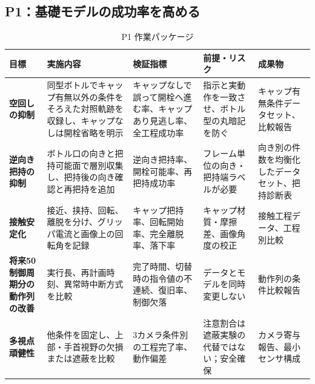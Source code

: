 \begin{landscape}
\section{P1：基礎モデルの成功率を高める}
\begin{table}[H]
\centering\footnotesize
\renewcommand{\arraystretch}{1.35}
\caption{P1 作業パッケージ}
\begin{tabularx}{\linewidth}{>{\bfseries}p{24mm}p{48mm}p{65mm}p{55mm}X}
\toprule
目標 & 実施内容 & 検証指標 & 前提・リスク & 成果物\\
\midrule
空回しの抑制 & 同型ボトルでキャップ有無以外の条件をそろえた対照軌跡を収録し、キャップなしは開栓省略を明示 & キャップなしで誤って開栓へ進む率、キャップあり見逃し率、全工程成功率 & 指示と実動作を一致させ、ボトル型の丸暗記を防ぐ & キャップ有無条件データセット、比較報告\\
逆向き把持の抑制 & ボトル口の向きと把持可能面で層別収集し、把持後の向き確認と再把持を追加 & 逆向き把持率、開栓可能率、再把持成功率 & フレーム単位の向き・把持端ラベルが必要 & 向き別の件数を均衡化したデータセット、把持診断表\\
接触安定化 & 接近、挟持、回転、離脱を分け、グリッパ電流と画像上の回転角を記録 & キャップ把持率、回転開始率、完全離脱率、落下率 & キャップ材質・摩擦差、画像角度の校正 & 接触工程データ、工程別比較\\
将来50制御周期分の動作列の改善 & 実行長、再計画時刻、異常時中断方式を比較 & 完了時間、切替時の指令値の不連続、復旧率、制御欠落 & データとモデルを同時変更しない & 動作列の条件比較報告\\
多視点頑健性 & 他条件を固定し、上部・手首視野の欠損または遮蔽を比較 & 3カメラ条件別の工程完了率、動作偏差 & 注意割合は遮蔽実験の代替ではない；安全確保 & カメラ寄与報告、最小センサ構成\\
\bottomrule
\end{tabularx}
\end{table}
\end{landscape}

